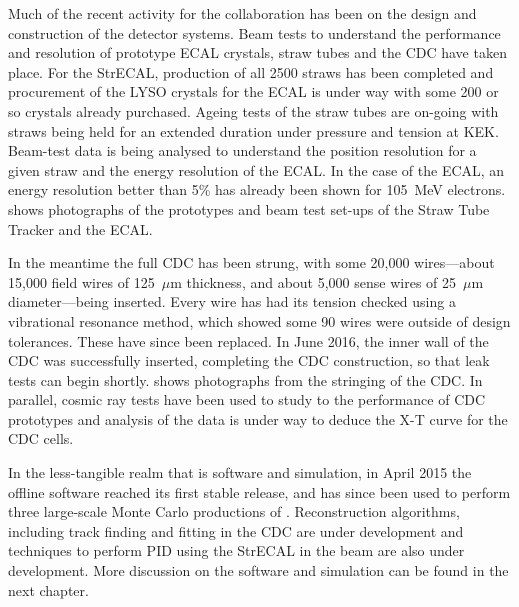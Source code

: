 \FigStatusStrECAL
Much of the recent activity for the collaboration has been on the design and construction of the detector systems.
Beam tests to understand the performance and resolution of prototype ECAL crystals, straw tubes and the \ac{CDC} have taken place.
For the \ac{StrECAL}, production of all 2500 \phaseI straws has been completed and procurement of the \ac{LYSO} crystals for the ECAL is under way with some 200 or so crystals already purchased.
Ageing tests of the straw tubes are on-going with straws being held for an extended duration under pressure and tension at KEK.
Beam-test data is being analysed to understand the position resolution for a given straw and the energy resolution of the ECAL.
In the case of the ECAL, an energy resolution better than 5\% has already been shown for 105~MeV electrons.
 shows photographs of the prototypes and beam test set-ups of the Straw Tube Tracker and the ECAL.

\FigStatusCyDet
In the meantime the full \ac{CDC} has been strung, with some 20,000 wires---about 15,000 field wires of 125~$\mu$m thickness, and about 5,000 sense wires of 25~$\mu$m diameter---being inserted.
Every wire has had its tension checked using a vibrational resonance method, which showed some 90 wires were outside of design tolerances.  These have since been replaced.
In June 2016, the inner wall of the CDC was successfully inserted, completing the CDC construction, so that leak tests can begin shortly.  
 shows photographs from the stringing of the \ac{CDC}.
In parallel, cosmic ray tests have been used to study to the performance of CDC prototypes and analysis of the data is under way to deduce the X-T curve for the CDC cells.

In the less-tangible realm that is software and simulation, in April 2015 the offline software reached its first stable release, and has since been used to perform three large-scale Monte Carlo productions of \phaseI.
Reconstruction algorithms, including track finding and fitting in the \ac{CDC} are under development and techniques to perform \ac{PID} using the \ac{StrECAL} in the \phaseI beam are also under development.
More discussion on the software and simulation can be found in the next chapter.
